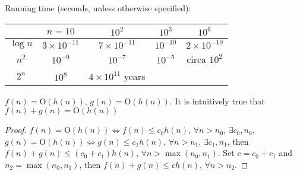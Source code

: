 Running time (seconds, unless otherwise specified):

\begin{tabular}{ccccc}
 & $n = 10$ & $10^2$ & $10^3$ & $10^6$ \\\hline
$\log n$ & $3 \times 10^{-11}$ & $7 \times 10^{-11}$ & $10^{-10}$ & $2 \times 10^{-10}$ \\\hline
$n^2$ & $10^{-9}$ & $10^{-7}$ & $10^{-5}$ & circa $10^{2}$ \\\hline
$2^n$ & $10^8$ & $4 \times 10^{11}$ years &  & 
\end{tabular}

$f(n) = \mathrm{O}(h(n))$, $g(n) = \mathrm{O}(h(n))$. It is intuitively true that $f(n) + g(n) = \mathrm{O}(h(n))$

\begin{proof}
$f(n) = \mathrm{O}(h(n)) \Leftrightarrow f(n) \leq c_0 h(n)$, $\forall n > n_0$,  $\exists c_0, n_0$, $g(n) = \mathrm{O}(h(n)) \Leftrightarrow g(n) \leq c_1 h(n)$, $\forall n > n_1$, $\exists c_1, n_1$, then $f(n) + g(n) \leq (c_0 + c_1) h(n)$, $\forall n > \max (n_0, n_1)$. Set $c = c_0 + c_1$ and $n_2 = \max (n_0, n_1)$, then $f(n) + g(n) \leq c h(n)$, $\forall n > n_2$.
\end{proof}
